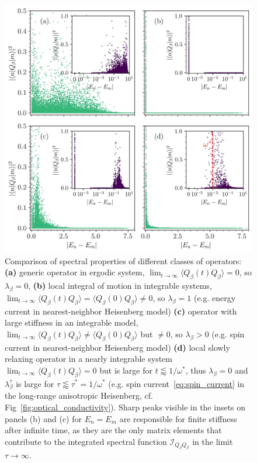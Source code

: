 \begin{figure}[H]
  \centering
  \includegraphics[width=\linewidth]{Figures/types_of_ops.jpg}
  \caption{Comparison of spectral properties of different classes of operators:
    \textbf{(a)} generic operator in ergodic system, \(\lim_{t \to \infty} \langle Q_{\beta }(t)Q_{\beta } \rangle = 0\), so \(\lambda_{\beta} = 0\),
    \textbf{(b)} local integral of motion in integrable systems, \(\lim_{t \to \infty} \langle Q_{\beta }(t)Q_{\beta } \rangle = \langle Q_{\beta }(0)Q_{\beta } \rangle \neq 0  \), so \(\lambda_{\beta} = 1\)  (e.g. energy current in nearest-neighbor Heisenberg model)
    \textbf{(c)} operator with large stiffness in an integrable model, \(\lim_{t \to \infty} \langle Q_{\beta }(t)Q_{\beta } \rangle \neq \langle Q_{\beta }(0)Q_{\beta } \rangle \) but
    \(\neq 0\), so \(\lambda_{\beta } > 0\)  (e.g. spin current in nearest-neighbor Heisenberg model)
    \textbf{(d)} local slowly relaxing operator in a nearly integrable system \(\lim_{t \to \infty} \langle Q_{\beta }(t)Q_{\beta } \rangle = 0 \) but
    is large for \(t \lessapprox  1/\omega^{\ast}  \), thus \(\lambda_{\beta } = 0\) and \(\lambda_{\beta }^{\tau }\) is large for \(\tau \lessapprox \tau^{\ast} = 1/\omega^{\ast} \)     (e.g. spin current~\eqref{eq:spin_current} in the long-range anisotropic Heisenberg, cf. Fig~\ref{fig:optical_conductivity}).
    Sharp peaks visible in the insets on panels (b) and (c) for \(E_n = E_m\) are responsible for finite stiffness after infinite time,
    as they are the only matrix elements that contribute to the integrated spectral function \(\mathcal{I}_{Q_{\beta }Q_{\beta }}\)  in the limit \(\tau \to \infty\).
  }
    \label{fig:types_of_ops}
\end{figure}


